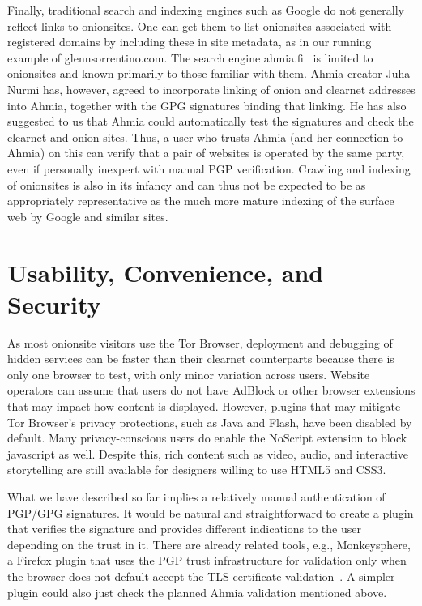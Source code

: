 \documentclass[10pt, conference, compsocconf]{styles/IEEEtran}
\begin{document}
Finally, traditional search and indexing engines such as Google do not
generally reflect links to onionsites. One can get them to list
onionsites associated with registered domains by including these in
site metadata, as in our running example of glennsorrentino.com.
The search engine
ahmia.fi~\cite{ahmia} is limited to onionsites and known primarily to
those familiar with them. Ahmia creator Juha Nurmi has, however,
agreed to incorporate linking of onion and clearnet addresses into
Ahmia, together with the GPG signatures binding that linking.  He has
also suggested to us that Ahmia could automatically test the
signatures and check the clearnet and onion sites. Thus, a user who
trusts Ahmia (and her connection to Ahmia) on this can verify that a
pair of websites is operated by the same party, even if personally
inexpert with manual PGP verification. Crawling and indexing of
onionsites is also in its infancy and can thus not be expected to be
as appropriately representative as the much more mature indexing of
the surface web by Google and similar sites.


\section{Usability, Convenience, and Security}

As most onionsite visitors use the Tor Browser, deployment and
debugging of hidden services can be faster than their clearnet
counterparts because there is only one browser to test, with only
minor variation across users.  Website operators can assume that users
do not have AdBlock or other browser extensions that may impact how
content is displayed.  However, plugins that may mitigate Tor
Browser's privacy protections, such as Java and Flash, have been
disabled by default.  Many privacy-conscious users do enable the
NoScript extension to block javascript as well.  Despite this, rich
content such as video, audio, and interactive storytelling are still
available for designers willing to use HTML5 and CSS3.

What we have described so far implies a relatively manual
authentication of PGP/GPG signatures. It would be natural and
straightforward to create a plugin that verifies the signature and
provides different indications to the user depending on the trust in
it.  There are already related tools, e.g., Monkeysphere, a Firefox
plugin that uses the PGP trust infrastructure for validation only when
the browser does not default accept the TLS certificate
validation~\cite{monkeysphere}. A simpler plugin could also
just check the planned Ahmia validation mentioned above.
\end{document}
